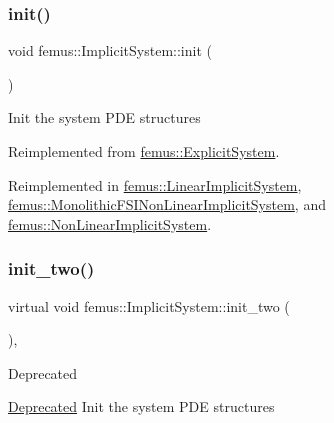 \mbox{\label{classfemus_1_1_implicit_system_a098b8d66e167a03759ca089bf0f0dc11}} 
\subsubsection{\texorpdfstring{init()}{init()}}
{\footnotesize\ttfamily void femus\+::\+Implicit\+System\+::init (\begin{DoxyParamCaption}{ }\end{DoxyParamCaption})\hspace{0.3cm}{\ttfamily [virtual]}}

Init the system P\+DE structures 

Reimplemented from \mbox{\hyperlink{classfemus_1_1_explicit_system_a6736fef684fe763b26e016ff3f8b37b7}{femus\+::\+Explicit\+System}}.



Reimplemented in \mbox{\hyperlink{classfemus_1_1_linear_implicit_system_a4605bac9ea670bb7dbd4454358155670}{femus\+::\+Linear\+Implicit\+System}}, \mbox{\hyperlink{classfemus_1_1_monolithic_f_s_i_non_linear_implicit_system_a07e04a8cce138cae9edcdd05fd1c7829}{femus\+::\+Monolithic\+F\+S\+I\+Non\+Linear\+Implicit\+System}}, and \mbox{\hyperlink{classfemus_1_1_non_linear_implicit_system_ad2d20975e0c919a9d99bdd9368a0212a}{femus\+::\+Non\+Linear\+Implicit\+System}}.

\mbox{\label{classfemus_1_1_implicit_system_a544e5b2b89fd2f8497b3ca6befce74d1}} 
\subsubsection{\texorpdfstring{init\+\_\+two()}{init\_two()}}
{\footnotesize\ttfamily virtual void femus\+::\+Implicit\+System\+::init\+\_\+two (\begin{DoxyParamCaption}{ }\end{DoxyParamCaption})\hspace{0.3cm}{\ttfamily [inline]}, {\ttfamily [virtual]}}

\begin{DoxyRefDesc}{Deprecated}
\item[\mbox{\hyperlink{deprecated__deprecated000009}{Deprecated}}]Init the system P\+DE structures \end{DoxyRefDesc}


